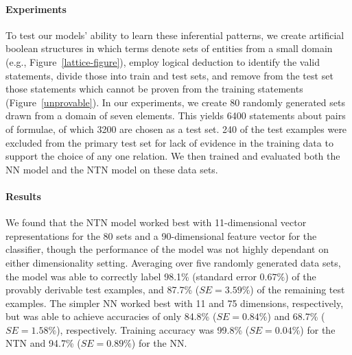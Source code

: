 \documentclass[letterpaper]{article}
\begin{document}
\paragraph{Experiments}
To test our models' ability to learn these inferential patterns, we
create artificial boolean structures in which terms denote sets of entities from
a small domain (e.g., Figure~\ref{lattice-figure}), employ logical
deduction to identify the valid statements, divide those into train
and test sets, and remove from the test set those statements which
cannot be proven from the training statements
(Figure~\ref{unprovable}). 
%
%
%
In our experiments, we create 80 randomly generated sets drawn from a
domain of seven elements. This yields 6400 statements about pairs of
formulae, of which 3200 are chosen as a test set. 240 of the test examples 
were excluded from the primary test set for lack of evidence in the training 
data to support the choice of any one relation. 
We then trained and evaluated both the NN model and the NTN model on these data sets. 

\paragraph{Results} 
We found that the NTN model worked best with 11-dimensional vector
representations for the 80 sets and a 90-dimensional feature vector
for the classifier, though the performance of the model was not highly
dependant on either dimensionality setting. 
Averaging over five randomly generated data sets, the model was able to correctly label 98.1\% (standard error $0.67\%$) of the provably derivable test examples, and 87.7\%
($\textit{SE} = 3.59\%$) of the remaining test examples. The simpler NN worked
best with 11 and 75 dimensions, respectively, but was able to achieve
accuracies of only 84.8\% ($\textit{SE} = 0.84\%$) and 68.7\% ($\textit{SE} = 1.58\%$),
respectively. Training accuracy was 99.8\% ($\textit{SE} = 0.04\%$) for the NTN and 94.7\% ($\textit{SE} = 0.89\%$) for
the NN.
\end{document}
